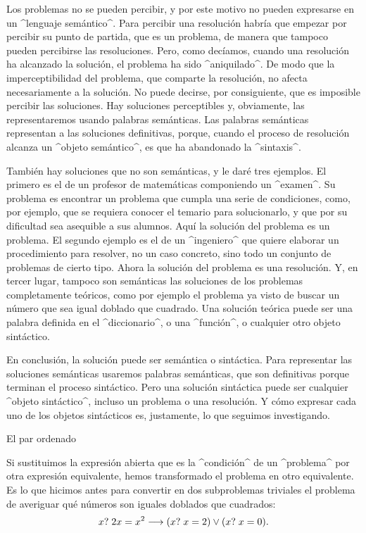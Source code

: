 Los problemas no se pueden percibir, y por este motivo no pueden
expresarse en un ^lenguaje semántico^. Para percibir una resolución
habría que empezar por percibir su punto de partida, que es un problema,
de manera que tampoco pueden percibirse las resoluciones. Pero, como
decíamos, cuando una resolución ha alcanzado la solución, el problema ha
sido ^aniquilado^. De modo que la imperceptibilidad del problema, que
comparte la resolución, no afecta necesariamente a la solución. No puede
decirse, por consiguiente, que es imposible percibir las soluciones. Hay
soluciones perceptibles y, obviamente, las representaremos usando
palabras semánticas. Las palabras semánticas representan a las
soluciones definitivas, porque, cuando el proceso de resolución alcanza
un ^objeto semántico^, es que ha abandonado la ^sintaxis^.

También hay soluciones que no son semánticas, y le daré tres ejemplos.
El primero es el de un profesor de matemáticas componiendo un ^examen^.
Su problema es encontrar un problema que cumpla una serie de
condiciones, como, por ejemplo, que se requiera conocer el temario para
solucionarlo, y que por su dificultad sea asequible a sus alumnos. Aquí
la solución del problema es un problema. El segundo ejemplo es el de un
^ingeniero^ que quiere elaborar un procedimiento para resolver, no un
caso concreto, sino todo un conjunto de problemas de cierto tipo. Ahora
la solución del problema es una resolución. Y, en tercer lugar, tampoco
son semánticas las soluciones de los problemas completamente teóricos,
como por ejemplo el problema ya visto de buscar un número que sea igual
doblado que cuadrado. Una solución teórica puede ser una palabra
definida en el ^diccionario^, o una ^función^, o cualquier otro objeto
sintáctico.

En conclusión, la solución puede ser semántica o sintáctica. Para
representar las soluciones semánticas usaremos palabras semánticas, que
son definitivas porque terminan el proceso sintáctico. Pero una solución
sintáctica puede ser cualquier ^objeto sintáctico^, incluso un problema
o una resolución. Y cómo expresar cada uno de los objetos sintácticos
es, justamente, lo que seguimos investigando.


\Section El par ordenado

Si sustituimos la expresión abierta que es la ^condición^ de un
^problema^ por otra expresión equivalente, hemos transformado el
problema en otro equivalente. Es lo que hicimos antes para convertir en
dos subproblemas triviales el problema de averiguar qué números son
iguales doblados que cuadrados:
$$x?\; 2x=x^2 \longrightarrow (x?\; x=2) \lor (x?\; x=0) .$$

